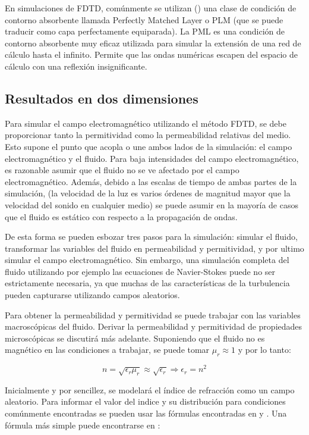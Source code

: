 En simulaciones de FDTD, comúnmente se utilizan (\cite{taflove_computational_2010}) una clase de condición de contorno absorbente llamada Perfectly Matched Layer o PLM (que se puede traducir como capa perfectamente equiparada). La PML es una condición de contorno absorbente muy eficaz utilizada para simular la extensión de una red de cálculo hasta el infinito. Permite que las ondas numéricas escapen del espacio de cálculo con una reflexión insignificante. 

\subsection{Resultados en dos dimensiones}

Para simular el campo electromagnético utilizando el método FDTD, se debe proporcionar tanto la permitividad como la permeabilidad relativas del medio. Esto supone el punto que acopla o une ambos lados de la simulación: el campo electromagnético y el fluido. Para baja intensidades del campo electromagnético, es razonable asumir que el fluido no se ve afectado por el campo electromagnético. Además, debido a las escalas de tiempo de ambas partes de la simulación, (la velocidad de la luz es varios órdenes de magnitud mayor que la velocidad del sonido en cualquier medio) se puede asumir en la mayoría de casos que el fluido es estático con respecto a la propagación de ondas.

De esta forma se pueden esbozar tres pasos para la simulación: simular el fluido, transformar las variables del fluido en permeabilidad y permitividad, y por ultimo simular el campo electromagnético. Sin embargo, una simulación completa del fluido utilizando por ejemplo las ecuaciones de Navier-Stokes puede no ser estrictamente necesaria, ya que muchas de las características de la turbulencia pueden capturarse utilizando campos aleatorios.

Para obtener la permeabilidad y permitividad se puede trabajar con las variables macroscópicas del fluido. Derivar la permeabilidad y permitividad de propiedades microscópicas se discutirá más adelante. Suponiendo que el fluido no es magnético en las condiciones a trabajar, se puede tomar $\mu_r \approx 1$ y por lo tanto:

\begin{equation}
    n = \sqrt{\epsilon_r \mu_r} \approx \sqrt{\epsilon_r} \Rightarrow \epsilon_r = n^2
\end{equation}

Inicialmente y por sencillez, se modelará el índice de refracción como un campo aleatorio. Para informar el valor del indice y su distribución para condiciones comúnmente encontradas se pueden usar las fórmulas encontradas en \cite{ciddor_refractive_1996} y \cite{mathar_refractive_2007}. Una fórmula más simple puede encontrarse en \cite{sasiela_electromagnetic_2007}:

